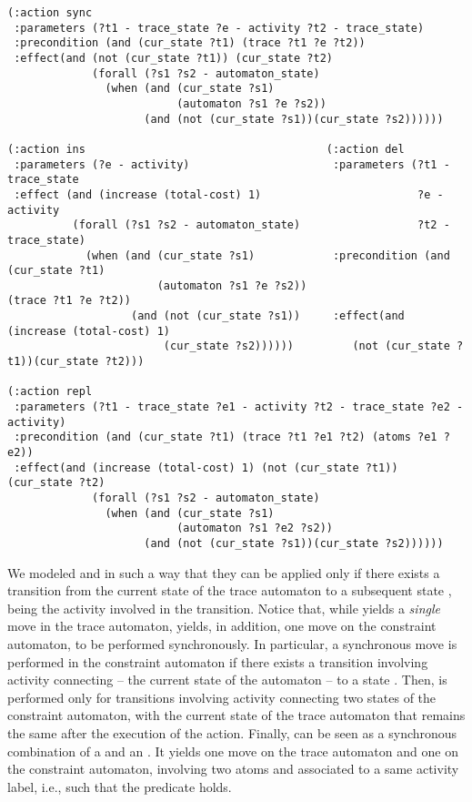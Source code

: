 \begin{scriptsize}
\begin{verbatim}
(:action sync
 :parameters (?t1 - trace_state ?e - activity ?t2 - trace_state)
 :precondition (and (cur_state ?t1) (trace ?t1 ?e ?t2))
 :effect(and (not (cur_state ?t1)) (cur_state ?t2)
             (forall (?s1 ?s2 - automaton_state)
               (when (and (cur_state ?s1)
                          (automaton ?s1 ?e ?s2))
                     (and (not (cur_state ?s1))(cur_state ?s2))))))
                     
(:action ins                                     (:action del
 :parameters (?e - activity)                      :parameters (?t1 - trace_state
 :effect (and (increase (total-cost) 1)                        ?e - activity
          (forall (?s1 ?s2 - automaton_state)                  ?t2 - trace_state)
            (when (and (cur_state ?s1)            :precondition (and (cur_state ?t1)
                       (automaton ?s1 ?e ?s2))                     (trace ?t1 ?e ?t2))
                   (and (not (cur_state ?s1))     :effect(and (increase (total-cost) 1)
                        (cur_state ?s2))))))         (not (cur_state ?t1))(cur_state ?t2)))

(:action repl
 :parameters (?t1 - trace_state ?e1 - activity ?t2 - trace_state ?e2 - activity)
 :precondition (and (cur_state ?t1) (trace ?t1 ?e1 ?t2) (atoms ?e1 ?e2))
 :effect(and (increase (total-cost) 1) (not (cur_state ?t1)) (cur_state ?t2)
             (forall (?s1 ?s2 - automaton_state)
               (when (and (cur_state ?s1)
                          (automaton ?s1 ?e2 ?s2))
                     (and (not (cur_state ?s1))(cur_state ?s2))))))
\end{verbatim}
\end{scriptsize}
\smallskip

\noindent
We modeled  and  in such a way that they can be applied only if there exists a transition from the current state  of the trace automaton to a subsequent state , being  the activity involved in the transition.
Notice that, while   yields a \emph{single} move in the trace automaton,  yields, in addition, one move on the constraint automaton, to be performed synchronously. In particular, a synchronous move is performed in the constraint automaton if there exists a transition involving activity  connecting  -- the current state of the automaton -- to a state .
%
Then,   is performed only for transitions involving activity  connecting two states of the constraint automaton, with the current state of the trace automaton that remains the same after the execution of the action.
%
Finally,   can be seen as a synchronous combination of a  and an . It yields one move on the trace automaton and one on the constraint automaton, involving two atoms  and  associated to a same activity label, i.e., such that the predicate  holds.

